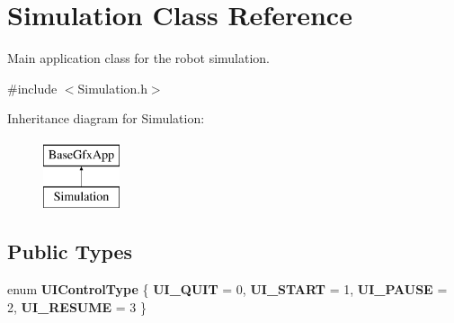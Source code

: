 \hypertarget{classSimulation}{\section{Simulation Class Reference}
\label{classSimulation}
}


Main application class for the robot simulation.  




{\ttfamily \#include $<$Simulation.\-h$>$}

Inheritance diagram for Simulation\-:\begin{figure}[H]
\begin{center}
\leavevmode
\includegraphics[height=2.000000cm]{classSimulation}
\end{center}
\end{figure}
\subsection*{Public Types}
\begin{DoxyCompactItemize}
\item 
enum {\bfseries U\-I\-Control\-Type} \{ {\bfseries U\-I\-\_\-\-Q\-U\-I\-T} = 0, 
{\bfseries U\-I\-\_\-\-S\-T\-A\-R\-T} = 1, 
{\bfseries U\-I\-\_\-\-P\-A\-U\-S\-E} = 2, 
{\bfseries U\-I\-\_\-\-R\-E\-S\-U\-M\-E} = 3
 \}
\end{DoxyCompactItemize}
